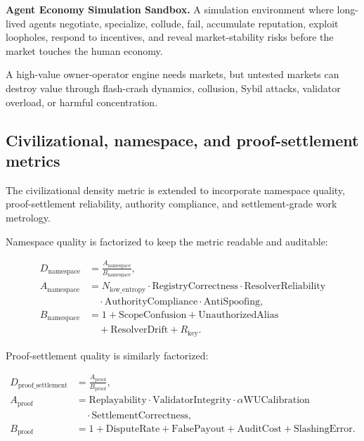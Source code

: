 \textbf{Agent Economy Simulation Sandbox.} A simulation environment
where long-lived agents negotiate, specialize, collude, fail, accumulate
reputation, exploit loopholes, respond to incentives, and reveal
market-stability risks before the market touches the human economy.

A high-value owner-operator engine needs markets, but untested markets
can destroy value through flash-crash dynamics, collusion, Sybil
attacks, validator overload, or harmful concentration.

\subsection{Civilizational, namespace, and proof-settlement
metrics}\label{civilizational-namespace-and-proof-settlement-metrics}

The civilizational density metric is extended to incorporate namespace
quality, proof-settlement reliability, authority compliance, and
settlement-grade work metrology.

Namespace quality is factorized to keep the metric readable and
auditable:

\[
\begin{aligned}
D_{\mathrm{namespace}}&=\frac{A_{\mathrm{namespace}}}{B_{\mathrm{namespace}}},\\
A_{\mathrm{namespace}}&=N_{\mathrm{low\_entropy}}
\cdot\mathrm{RegistryCorrectness}\cdot\mathrm{ResolverReliability}\\
&\quad\cdot\mathrm{AuthorityCompliance}\cdot\mathrm{AntiSpoofing},\\
B_{\mathrm{namespace}}&=1+\mathrm{ScopeConfusion}+\mathrm{UnauthorizedAlias}\\
&\quad+\mathrm{ResolverDrift}+R_{\mathrm{key}}.
\end{aligned}
\]

Proof-settlement quality is similarly factorized:

\[
\begin{aligned}
D_{\mathrm{proof\_settlement}}&=\frac{A_{\mathrm{proof}}}{B_{\mathrm{proof}}},\\
A_{\mathrm{proof}}&=\mathrm{Replayability}\cdot\mathrm{ValidatorIntegrity}
\cdot\alpha\mathrm{WUCalibration}\\
&\quad\cdot\mathrm{SettlementCorrectness},\\
B_{\mathrm{proof}}&=1+\mathrm{DisputeRate}+\mathrm{FalsePayout}+
\mathrm{AuditCost}+\mathrm{SlashingError}.
\end{aligned}
\]

